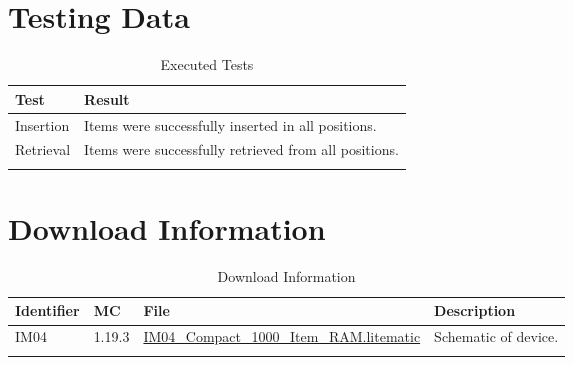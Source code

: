 \documentclass[10pt]{datasheet}
\begin{document}
\section{Testing Data}

\begin{table}[H]
\caption{Executed Tests}
\begin{tabularx}{\textwidth}{l | X}
    \thickhline
    \textbf{Test} & \textbf{Result} \\
    \hline
    Insertion & Items were successfully inserted in all positions. \\
    \hline
    Retrieval & Items were successfully retrieved from all positions. \\
    \thickhline
\end{tabularx}
\end{table}

\section{Download Information}
\begin{table}[H]
    \caption{Download Information}
    \begin{tabularx}{\textwidth}{l | l | l | X}
        \thickhline
        \textbf{Identifier} & \textbf{MC} & \textbf{File} & \textbf{Description} \\
        \hline
        IM04 & 1.19.3 & \href{https://github.com/Soontech-Annals/Archive/blob/2b73adfd252c5e2cf9d202454dbef78a586bc482/Archive/item-memory/IM04\%20Compact\%201000\%20Item\%20RAM/IM04\_Compact\_1000\_Item\_RAM.litematic?raw=1}{IM04\_Compact\_1000\_Item\_RAM.litematic} & Schematic of device. \\
        \hline
        \thickhline
    \end{tabularx}
\end{table}
\end{document}
